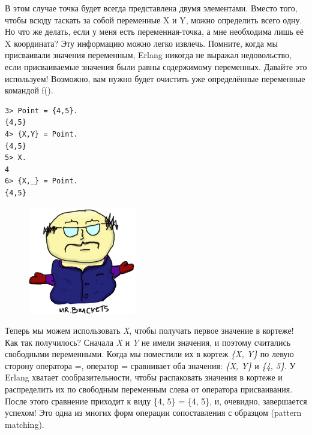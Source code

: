 \documentclass[a4paper,12pt]{report}
\newcommand{\ops}{\colorbox{lgreen}}
\begin{document}
В этом случае точка будет всегда представлена двумя элементами. Вместо того, чтобы всюду таскать за собой переменные X и Y, можно определить всего одну. Но что же делать, если у меня есть переменная\--точка, а мне необходима лишь её X координата? Эту информацию можно легко извлечь. Помните, когда мы присваивали значения переменным, Erlang никогда не выражал недовольство, если присваиваемые значения были равны содержимому переменных. Давайте это используем! Возможно, вам нужно будет очистить уже определённые переменные командой \ops{f()}.
\begin{lstlisting}[style=repl]
3> Point = {4,5}.
{4,5}
4> {X,Y} = Point.
{4,5}
5> X.
4
6> {X,_} = Point.
{4,5}
\end{lstlisting}
\begin{figure}
    \includegraphics[width=1.0\linewidth]{mr-brackets.png}
\end{figure}

Теперь мы можем использовать \emph{X}, чтобы получать первое значение в кортеже! Как так получилось? Сначала \emph{X} и \emph{Y} не имели значения, и поэтому считались свободными переменными. Когда мы поместили их в кортеж \emph{\{X, Y\}} по левую сторону оператора \ops{=}, оператор \ops{=} сравнивает оба значения: \emph{\{X, Y\}} и \emph{\{4, 5\}}. У Erlang хватает сообразительности, чтобы распаковать значения в кортеже и распределить их по свободным переменным слева от оператора присваивания. После этого сравнение приходит к виду \ops{\{4, 5\} = \{4, 5\}}, и, очевидно, завершается успехом! Это одна из многих форм операции сопоставления с образцом (pattern matching).
\end{document}
